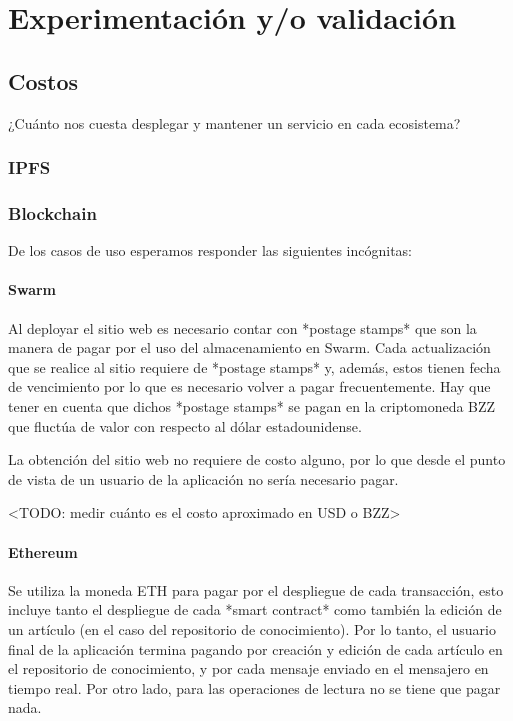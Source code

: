 \section{Experimentación y/o validación}

\subsection{Costos}
¿Cuánto nos cuesta desplegar y mantener un servicio en cada ecosistema?

\subsubsection{IPFS}

\subsubsection{Blockchain}


De los casos de uso esperamos responder las siguientes incógnitas: %

\paragraph{Swarm}
Al deployar el sitio web es necesario contar con *postage stamps* que son la manera de pagar por el uso del almacenamiento en Swarm. Cada actualización que se realice al sitio requiere de *postage stamps* y, además, estos tienen fecha de vencimiento por lo que es necesario volver a pagar frecuentemente. Hay que tener en cuenta que dichos *postage stamps* se pagan en la criptomoneda BZZ que fluctúa de valor con respecto al dólar estadounidense.

La obtención del sitio web no requiere de costo alguno, por lo que desde el punto de vista de un usuario de la aplicación no sería necesario pagar.

<TODO: medir cuánto es el costo aproximado en USD o BZZ>

\paragraph{Ethereum}
Se utiliza la moneda ETH para pagar por el despliegue de cada transacción, esto incluye tanto el despliegue de cada *smart contract* como también la edición de un artículo (en el caso del repositorio de conocimiento). Por lo tanto, el usuario final de la aplicación termina pagando por creación y edición de cada artículo en el repositorio de conocimiento, y por cada mensaje enviado en el mensajero en tiempo real. Por otro lado, para las operaciones de lectura no se tiene que pagar nada.

